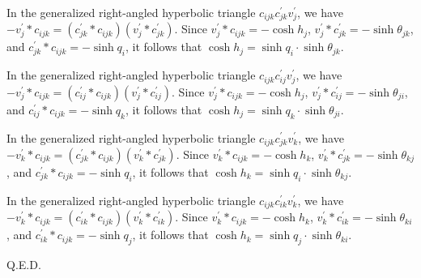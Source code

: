 \documentclass[12pt]{amsart}
\theoremstyle{definition}
\def\qed{\hfill{Q.E.D.}\smallskip}
\begin{document}
\begin{description}
In the generalized right-angled hyperbolic triangle $c_{ijk}c^\prime_{jk}v^\prime_j$,
we have $-v^\prime_j\ast c_{ijk}=(c^\prime_{jk}\ast c_{ijk})(v^\prime_j\ast c^\prime_{jk})$.
Since $v^\prime_j\ast c_{ijk}=-\cosh h_j$,
$v^\prime_j\ast c^\prime_{jk}=-\sinh \theta_{jk}$,
and $c^\prime_{jk}\ast c_{ijk}=-\sinh q_i$,
it follows that $\cosh h_j=\sinh q_i\cdot\sinh \theta_{jk}$.

In the generalized right-angled hyperbolic triangle $c_{ijk}c^\prime_{ij}v^\prime_j$,
we have $-v^\prime_j\ast c_{ijk}=(c^\prime_{ij}\ast c_{ijk})(v^\prime_j\ast c^\prime_{ij})$.
Since $v^\prime_j\ast c_{ijk}=-\cosh h_j$,
$v^\prime_j\ast c^\prime_{ij}=-\sinh \theta_{ji}$, and
$c^\prime_{ij}\ast c_{ijk}=-\sinh q_k$,
it follows that $\cosh h_j=\sinh q_k\cdot\sinh \theta_{ji}$.

In the generalized right-angled hyperbolic triangle $c_{ijk}c^\prime_{jk}v^\prime_k$,
we have $-v^\prime_k\ast c_{ijk}=(c^\prime_{jk}\ast c_{ijk})(v^\prime_k\ast c^\prime_{jk})$.
Since $v^\prime_k\ast c_{ijk}=-\cosh h_k$,
$v^\prime_k\ast c^\prime_{jk}=-\sinh \theta_{kj}$, and
$c^\prime_{jk}\ast c_{ijk}=-\sinh q_i$,
it follows that $\cosh h_k=\sinh q_i\cdot\sinh \theta_{kj}$.

In the generalized right-angled hyperbolic triangle $c_{ijk}c^\prime_{ik}v^\prime_k$,
we have $-v^\prime_k\ast c_{ijk}=(c^\prime_{ik}\ast c_{ijk})(v^\prime_k\ast c^\prime_{ik})$.
Since $v^\prime_k\ast c_{ijk}=-\cosh h_k$,
$v^\prime_k\ast c^\prime_{ik}=-\sinh \theta_{ki}$, and
$c^\prime_{ik}\ast c_{ijk}=-\sinh q_j$,
it follows that $\cosh h_k=\sinh q_j\cdot\sinh \theta_{ki}$.
\end{description}
\qed
\end{document}
